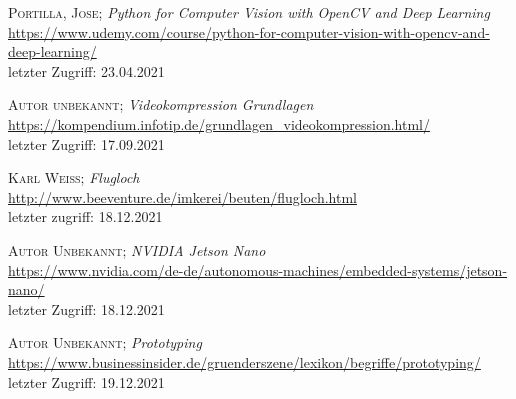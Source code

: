 \documentclass[11pt,a4paper]{article}
\newcommand{\bibLabel}[1]{\label{#1}\hypertarget{#1}{}}
\begin{document}
\begin{thebibliography}
 \bibLabel{udemy}
	\textsc{Portilla, Jose};
	\textit{Python for Computer Vision with OpenCV and Deep Learning}\\
	\url{https://www.udemy.com/course/python-for-computer-vision-with-opencv-and-deep-learning/}\\
	letzter Zugriff: 23.04.2021

 \bibLabel{compression}
	\textsc{Autor unbekannt};
	\textit{Videokompression Grundlagen}\\
	\url{https://kompendium.infotip.de/grundlagen_videokompression.html/}\\
	letzter Zugriff: 17.09.2021

 \bibLabel{flugloch}
    \textsc{Karl Weiß};
    \textit{Flugloch}\\
    \url{http://www.beeventure.de/imkerei/beuten/flugloch.html}\\
    letzter zugriff: 18.12.2021

 \bibLabel{jetson-nano}
    \textsc{Autor Unbekannt};
    \textit{NVIDIA Jetson Nano}\\
    \url{https://www.nvidia.com/de-de/autonomous-machines/embedded-systems/jetson-nano/}\\
    letzter Zugriff: 18.12.2021

 \bibLabel{protoyping}
    \textsc{Autor Unbekannt};
    \textit{Prototyping}\\
    \url{https://www.businessinsider.de/gruenderszene/lexikon/begriffe/prototyping/}\\
    letzter Zugriff: 19.12.2021

\end{thebibliography}
\end{document}
